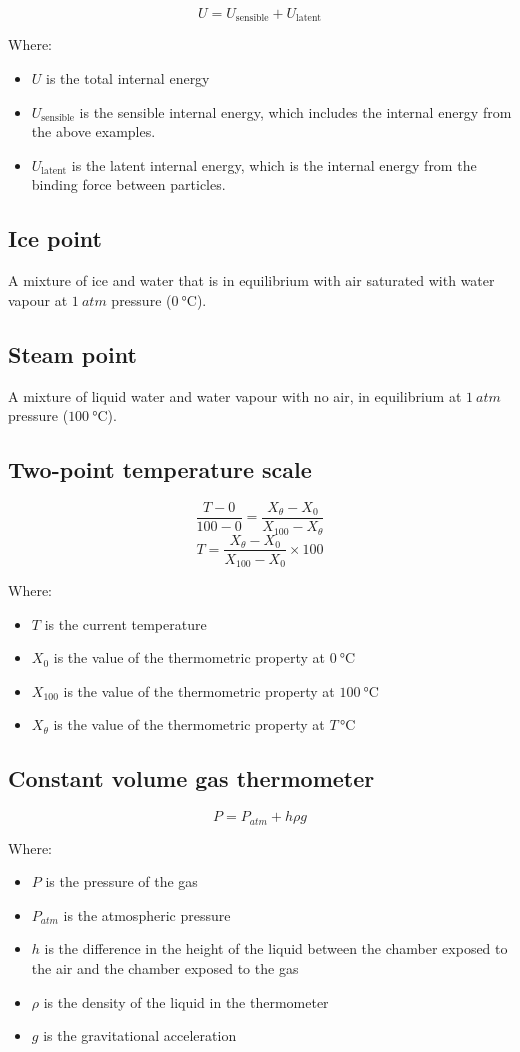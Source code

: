 \documentclass[11pt]{article}
\begin{document}
\[U = U_{\text{sensible}} + U_{\text{latent}}\]

Where:
\begin{itemize}
\item \(U\) is the total internal energy
\item \(U_{\text{sensible}}\) is the sensible internal energy, which includes the internal energy from the above examples.
\item \(U_{\text{latent}}\) is the latent internal energy, which is the internal energy from the binding force between particles.
\end{itemize}
\subsection{Ice point}
\label{sec:org41b2a9d}
A mixture of ice and water that is in equilibrium with air saturated with water vapour at \(\qty{1}{atm}\) pressure (\(\qty{0}{\degreeCelsius}\)).
\subsection{Steam point}
\label{sec:orgd96d70e}
A mixture of liquid water and water vapour with no air, in equilibrium at \(\qty{1}{atm}\) pressure (\(\qty{100}{\degreeCelsius}\)).
\subsection{Two-point temperature scale}
\label{sec:org7ed8827}
\[\frac{T - 0}{100 - 0} = \frac{X_\theta - X_0}{X_{100} - X_\theta}\]
\[T = \frac{X_\theta - X_0}{X_{100} - X_0} \times 100\]

Where:
\begin{itemize}
\item \(T\) is the current temperature
\item \(X_0\) is the value of the thermometric property at \(\qty{0}{\degreeCelsius}\)
\item \(X_{100}\) is the value of the thermometric property at \(\qty{100}{\degreeCelsius}\)
\item \(X_\theta\) is the value of the thermometric property at \(T \, \unit{\degreeCelsius}\)
\end{itemize}
\subsection{Constant volume gas thermometer}
\label{sec:org5ed4d39}
\[P = P_{atm} + h \rho g\]

Where:
\begin{itemize}
\item \(P\) is the pressure of the gas
\item \(P_{atm}\) is the atmospheric pressure
\item \(h\) is the difference in the height of the liquid between the chamber exposed to the air and the chamber exposed to the gas
\item \(\rho\) is the density of the liquid in the thermometer
\item \(g\) is the gravitational acceleration
\end{itemize}
\end{document}
